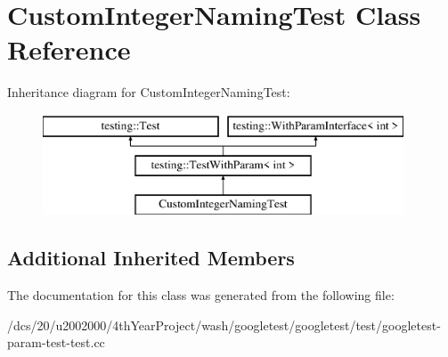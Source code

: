\hypertarget{classCustomIntegerNamingTest}{}\section{Custom\+Integer\+Naming\+Test Class Reference}
\label{classCustomIntegerNamingTest}
Inheritance diagram for Custom\+Integer\+Naming\+Test\+:\begin{figure}[H]
\begin{center}
\leavevmode
\includegraphics[height=3.000000cm]{classCustomIntegerNamingTest}
\end{center}
\end{figure}
\subsection*{Additional Inherited Members}


The documentation for this class was generated from the following file\+:\begin{DoxyCompactItemize}
\item 
/dcs/20/u2002000/4th\+Year\+Project/wash/googletest/googletest/test/googletest-\/param-\/test-\/test.\+cc\end{DoxyCompactItemize}
